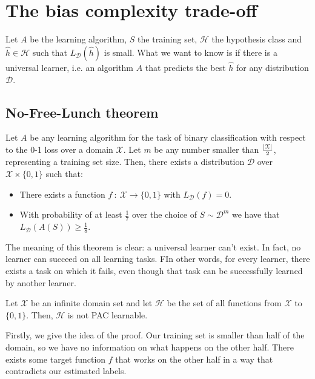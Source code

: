 \documentclass[../../main/main.tex]{subfiles}
\begin{document}
\chapter{The bias complexity trade-off}

Let \( A \) be the learning algorithm, \( S \) the training set, \( \mathcal{H} \) the hypothesis class and \( \hat{h} \in \mathcal{H} \) such that \( L_{\mathcal{D}}(\hat{h}) \) is small. What we want to know is if there is a universal learner, i.e. an algorithm \( A \) that predicts the best \( \hat{h} \) for any distribution \( \mathcal{D} \).





\section{No-Free-Lunch theorem}
\begin{theorem}
    Let \( A \) be any learning algorithm for the task of binary classification with respect to the 0-1 loss over a domain \( \mathcal{X} \).
    Let \( m \) be any number smaller than \( \frac{\abs{\mathcal{X}}}{2} \), representing a training set size.
    Then, there exists a distribution \( \mathcal{D} \) over \( \mathcal{X} \times \{0,1\} \) such that:
    \begin{itemize}
        \item There exists a function \( f \ : \ \mathcal{X} \to \{0,1\} \) with \( L_{\mathcal{D}}(f) = 0 \).
        \item With probability of at least \( \frac{1}{7} \) over the choice of \( S \sim \mathcal{D}^m \) we have that \( L_{\mathcal{D}}(A(S)) \ge \frac{1}{8} \).
    \end{itemize}
\end{theorem}

The meaning of this theorem is clear: a universal learner can't exist. In fact, no learner can succeed on all learning tasks. FIn other words, for every learner, there exists a task on which it fails, even though that task can be successfully learned by another learner.

\begin{corollary}[]
    Let \( \mathcal{X} \) be an infinite domain set and let \( \mathcal{H} \) be the set of all functions from \( \mathcal{X} \) to \( \{0,1\} \). Then, \( \mathcal{H} \) is not PAC learnable.
\end{corollary}

Firstly, we give the idea of the proof. Our training set is smaller than half of the domain, so we have no information on what happens on the other half. There exists some target function \( f \) that works on the other half in a way that contradicts our estimated labels.
\end{document}
